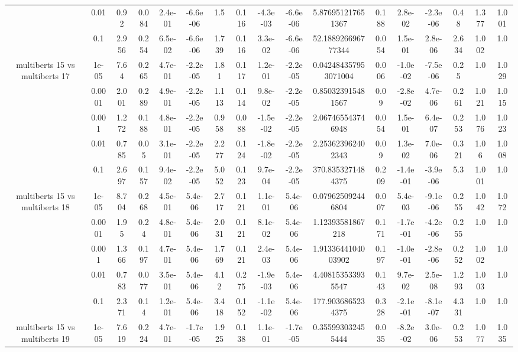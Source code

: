 \begin{tabular}{|c|c|c|c|c|c|c|c|c|c|c|c|c|c|c|c|c|}
 & 0.01 & 0.92 & 0.084 & 2.4e-01 & -6.6e-06 & 1.5 & 0.116 & -4.3e-03 & -6.6e-06 & 5.876951217651367 & 0.188 & 2.8e-02 & -2.3e-06 & 0.48 & 1.377 & 1.001 \\
 & 0.1 & 2.956 & 0.254 & 6.5e-02 & -6.6e-06 & 1.739 & 0.116 & 3.3e-02 & -6.6e-06 & 52.188926696777344 & 0.054 & 1.5e-01 & 2.8e-06 & 2.634 & 1.002 & 1.0 \\
\hline
\multirow{5}{*}{multiberts 15 vs multiberts 17} & 1e-05 & 7.64 & 0.265 & 4.7e-01 & -2.2e-05 & 1.81 & 0.117 & 1.2e-01 & -2.2e-05 & 0.042484357953071004 & 0.006 & -1.0e-02 & -7.5e-06 & 0.25 & 1.0 & 1.029 \\
 & 0.0001 & 2.001 & 0.289 & 4.9e-01 & -2.2e-05 & 1.113 & 0.114 & 9.8e-02 & -2.2e-05 & 0.850323915481567 & 0.09 & -2.8e-02 & 4.7e-06 & 0.261 & 1.021 & 1.015 \\
 & 0.001 & 1.272 & 0.188 & 4.8e-01 & -2.2e-05 & 0.958 & 0.088 & -1.5e-02 & -2.2e-05 & 2.067465543746948 & 0.054 & 1.5e-01 & 6.4e-07 & 0.253 & 1.076 & 1.023 \\
 & 0.01 & 0.785 & 0.05 & 3.1e-01 & -2.2e-05 & 2.277 & 0.124 & -1.8e-02 & -2.2e-05 & 2.253623962402343 & 0.09 & 1.3e-02 & 7.0e-06 & 0.321 & 1.06 & 1.008 \\
 & 0.1 & 2.697 & 0.157 & 9.4e-02 & -2.2e-05 & 5.052 & 0.123 & 9.7e-04 & -2.2e-05 & 370.8353271484375 & 0.209 & -1.4e-01 & -3.9e-06 & 5.3 & 1.001 & 1.0 \\
\hline
\multirow{5}{*}{multiberts 15 vs multiberts 18} & 1e-05 & 8.704 & 0.268 & 4.5e-01 & 5.4e-06 & 2.717 & 0.121 & 1.1e-01 & 5.4e-06 & 0.079625092446804 & 0.007 & 5.4e-03 & -9.1e-06 & 0.255 & 1.042 & 1.072 \\
 & 0.0001 & 1.95 & 0.24 & 4.8e-01 & 5.4e-06 & 2.031 & 0.121 & 8.1e-02 & 5.4e-06 & 1.12393581867218 & 0.171 & -1.7e-01 & -4.2e-06 & 0.255 & 1.0 & 1.0 \\
 & 0.001 & 1.366 & 0.197 & 4.7e-01 & 5.4e-06 & 1.769 & 0.121 & 2.4e-03 & 5.4e-06 & 1.9133644104003902 & 0.197 & -1.0e-01 & -2.8e-06 & 0.252 & 1.002 & 1.0 \\
 & 0.01 & 0.783 & 0.077 & 3.5e-01 & 5.4e-06 & 4.12 & 0.275 & -1.9e-03 & 5.4e-06 & 4.408153533935547 & 0.143 & 9.7e-02 & 2.5e-08 & 1.293 & 1.003 & 1.0 \\
 & 0.1 & 2.371 & 0.14 & 1.2e-01 & 5.4e-06 & 3.418 & 0.152 & -1.1e-02 & 5.4e-06 & 177.9036865234375 & 0.328 & -2.1e-01 & -8.1e-07 & 4.331 & 1.0 & 1.0 \\
\hline
\multirow{5}{*}{multiberts 15 vs multiberts 19} & 1e-05 & 7.619 & 0.224 & 4.7e-01 & -1.7e-05 & 1.925 & 0.138 & 1.1e-01 & -1.7e-05 & 0.355993032455444 & 0.035 & -8.2e-02 & 3.0e-06 & 0.253 & 1.077 & 1.035 \\

\end{tabular}
